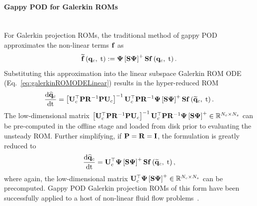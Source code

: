 \paragraph*{Gappy POD for Galerkin ROMs}\mbox{}\\
%
For Galerkin projection ROMs, the traditional method of gappy POD approximates the non-linear terms $\mathbf{f}$ as
%
\begin{equation}
	\rhsApproxFunc{\consVec, \; \timeVar} \defEq \deimBasis \left[ \sampMat \deimBasis \right]^+ \sampMat \rhsFunc{\consVec, \; \timeVar}.
\end{equation}
%
Substituting this approximation into the linear subspace Galerkin ROM ODE (Eq.~\ref{eq:galerkinROMODELinear}) results in the hyper-reduced ROM
%
\begin{equation}\label{eq:galerkinROMHR}
    \ode{\consVecCoef}{\timeVar} = \left[\consTrial^\top \consScale \resScaleInv \consScale \consTrial\right]^{-1} \consTrial^\top \consScale \resScaleInv \deimBasis \left[ \sampMat \deimBasis \right]^+ \sampMat \rhsFunc{\consVecRom, \; \timeVar}.
\end{equation}
%
The low-dimensional matrix $\left[\consTrial^\top \consScale \resScaleInv \consScale \consTrial\right]^{-1} \consTrial^\top \consScale \resScaleInv \deimBasis \left[ \sampMat \deimBasis \right]^+ \inRTwo{\numConsModes}{\numSamps}$ can be pre-computed in the offline stage and loaded from disk prior to evaluating the unsteady ROM. Further simplifying, if $\consScale = \resScale = \identMat$, the formulation is greatly reduced to
%
\begin{equation}
    \ode{\consVecCoef}{\timeVar} = \consTrial^\top \deimBasis \left[ \sampMat \deimBasis \right]^+ \sampMat \rhsFunc{\consVecRom, \; \timeVar},
\end{equation}
%
where again, the low-dimensional matrix $\consTrial^\top \deimBasis \left[ \sampMat \deimBasis \right]^+ \inRTwo{\numConsModes}{\numSamps}$ can be precomputed. Gappy POD Galerkin projection ROMs of this form have been successfully applied to a host of non-linear fluid flow problems~\cite{Chaturantabut2011,Stefanescu2013,Wirtz2014,Amsallem2015,Alla2017}.

